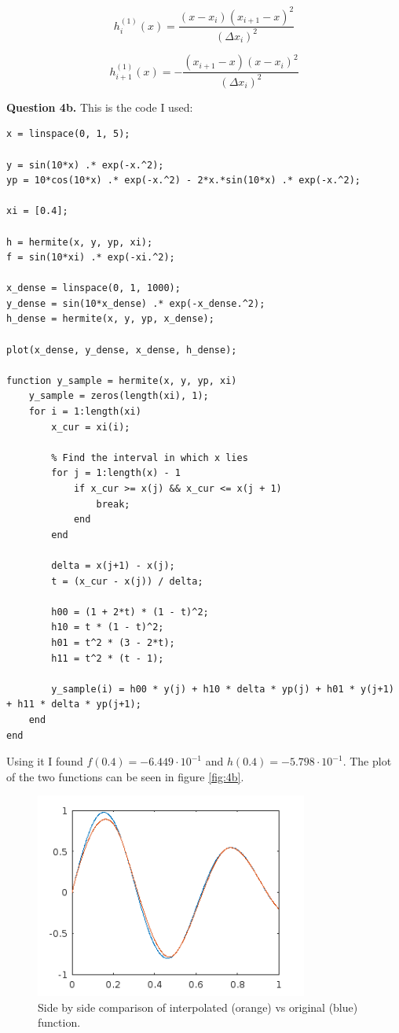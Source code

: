 \documentclass[letterpaper, reqno,11pt]{article}
\begin{document}
\begin{equation}
h_{i}^{(1)}(x) = \frac{(x - x_{i})(x_{i+1} - x)^{2}}{(\Delta x_{i})^{2}}
\end{equation}

\begin{equation}
h_{i+1}^{(1)}(x) = -\frac{(x_{i+1} - x)(x - x_{i})^{2}}{(\Delta x_{i})^{2}}
\end{equation}

{\medskip\noindent\bf Question 4b.} This is the code I used:

\begin{lstlisting}
x = linspace(0, 1, 5);

y = sin(10*x) .* exp(-x.^2);
yp = 10*cos(10*x) .* exp(-x.^2) - 2*x.*sin(10*x) .* exp(-x.^2);

xi = [0.4];

h = hermite(x, y, yp, xi);
f = sin(10*xi) .* exp(-xi.^2);

x_dense = linspace(0, 1, 1000);
y_dense = sin(10*x_dense) .* exp(-x_dense.^2);
h_dense = hermite(x, y, yp, x_dense);

plot(x_dense, y_dense, x_dense, h_dense);

function y_sample = hermite(x, y, yp, xi)
    y_sample = zeros(length(xi), 1);
    for i = 1:length(xi)
        x_cur = xi(i);
        
        % Find the interval in which x lies
        for j = 1:length(x) - 1
            if x_cur >= x(j) && x_cur <= x(j + 1)
                break;
            end
        end
        
        delta = x(j+1) - x(j);
        t = (x_cur - x(j)) / delta;
        
        h00 = (1 + 2*t) * (1 - t)^2;
        h10 = t * (1 - t)^2;
        h01 = t^2 * (3 - 2*t);
        h11 = t^2 * (t - 1);
        
        y_sample(i) = h00 * y(j) + h10 * delta * yp(j) + h01 * y(j+1) + h11 * delta * yp(j+1);
    end
end
\end{lstlisting}

Using it I found $f(0.4)=-6.449\cdot 10^{-1}$ and $h(0.4)=-5.798\cdot 10^{-1}$. The plot of the two functions can be seen in figure \ref{fig:4b}.

\begin{figure}[htpb]
    \centering
    \includegraphics[width=0.8\textwidth]{q4b}
    \caption{Side by side comparison of interpolated (orange) vs original (blue) function.}
    \label{fig:q4b}
\end{figure}
\end{document}
